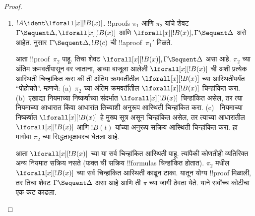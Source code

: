 \documentclass[../../../include/open-logic-section]{subfiles}
\begin{document}
\begin{proof}
\begin{enumerate}
  $\Gamma \Sequent \Delta, !B$ ची
  !!a{proof} $\pi_2'$ आणि
  $!C, \Gamma \Sequent \Delta$ ची
  !!a{proof} $\pi_2''$ मिळते.
  हे $\pi_2''$ ला लावल्यास
  $!C, !B, \Gamma \Sequent \Delta$
  ची !!a{proof}~$\pi_2'''$ मिळते.
  !!{proof}~$\pi'$ पुढीलप्रमाणे आहे:
  \[
  \AxiomC{}
  \RightLabel{$\pi_2'$}
  \Deduce$\Gamma \fCenter \Delta, !B$
  \AxiomC{}
  \RightLabel{$\pi_1'$}
  \Deduce$!B, \Gamma \fCenter \Delta, !C$
  \AxiomC{}
  \RightLabel{$\pi_2'''$}
  \Deduce$!C, !B, \Gamma \fCenter \Delta$
  \RightLabel{\CutCS}
  \BinaryInf$!B, \Gamma \fCenter \Delta$
  \RightLabel{\CutCS}
  \BinaryInf$\Gamma \fCenter \Delta$
  \DisplayProof
  \]
  \item $!A \ident \lforall[x][!B(x)]$.
  !!{proof}s $\pi_1$ आणि $\pi_2$
  यांचे शेवट
  $\Gamma \Sequent \Delta, \lforall[x][!B(x)]$
  आणि $\lforall[x][!B(x)], \Gamma \Sequent \Delta$
  असे आहेत.  नुसार
  $\Gamma \Sequent \Delta, !B(c)$ ची
  !!a{proof}~$\pi_1'$ मिळते.

आता !!{proof}~$\pi_2$ पाहू. तिचा शेवट
$\lforall[x][!B(x)], \Gamma \Sequent \Delta$
असा आहे. $\pi_2$ च्या अंतिम क्रमवर्तीपासून
वर जाताना, डाव्या बाजूला आलेली
$\lforall[x][!B(x)]$ ची अशी प्रत्येक आस्थिती
चिन्हांकित करा की ती अंतिम क्रमवर्तीतील
$\lforall[x][!B(x)]$ च्या आस्थितीपर्यंत
“पोहोचते”. म्हणजे:
(a)~$\pi_2$ च्या अंतिम क्रमवर्तीतील
$\lforall[x][!B(x)]$ चिन्हांकित करा.
(b)~एखाद्या नियमाच्या निष्कर्षाच्या
संदर्भात $\lforall[x][!B(x)]$ चिन्हांकित
असेल, तर त्या नियमाच्या आधारात किंवा
आधारांत तिच्याशी अनुरूप आस्थिती चिन्हांकित
करा. (c)~\LeftR{\lforall} नियमाच्या
निष्कर्षात $\lforall[x][!B(x)]$ हे मुख्य
सूत्र असून चिन्हांकित असेल, तर त्याच्या
आधारातील $\lforall[x][!B(x)]$ आणि
$!B(t)$ यांच्या अनुरूप सक्रिय आस्थिती
चिन्हांकित करा. हा मागोवा $\pi_2$
च्या सिद्धतावृक्षावरच घेतला आहे.

आता $\lforall[x][!B(x)]$ च्या
या सर्व चिन्हांकित आस्थिती पाहू. त्यांपैकी
कोणतीही \LeftR{\lforall} व्यतिरिक्त
अन्य नियमात सक्रिय नसते
(फक्त \LeftR{\lforall} ची सक्रिय
!!{formula}s चिन्हांकित होतात).
$\pi_2$ मधील $\lforall[x][!B(x)]$
च्या सर्व चिन्हांकित आस्थिती काढून टाका.
यातून योग्य !!{proof} मिळाली, तर तिचा शेवट
$\Gamma \Sequent \Delta$ असा आहे आणि
ती $\pi$ च्या जागी ठेवता येते.
याने सर्वोच्च कोटीचा एक कट काढला.


\end{enumerate}
\end{proof}
\end{document}
